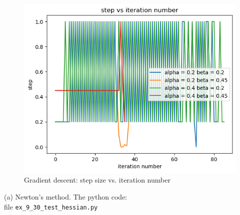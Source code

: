\documentclass{article}
\begin{document}
\begin{figure}[H]
	\includegraphics[width=\linewidth]{9_30_a_step.png}
	\caption{Gradient descent: step size vs. iteration number}
\end{figure}

(a) Newton's method. The python code: \\

file  \verb|ex_9_30_test_hessian.py|
\end{document}
